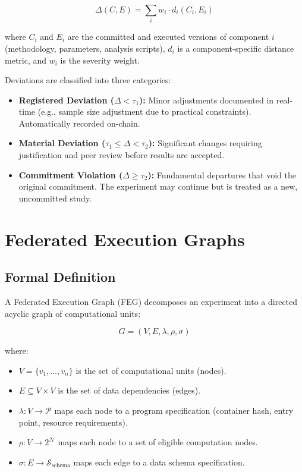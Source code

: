 \documentclass[11pt,a4paper]{article}
\begin{document}
\begin{equation}
    \Delta(C, E) = \sum_{i} w_i \cdot d_i(C_i, E_i)
\end{equation}

\noindent where $C_i$ and $E_i$ are the committed and executed versions of component $i$ (methodology, parameters, analysis scripts), $d_i$ is a component-specific distance metric, and $w_i$ is the severity weight.

Deviations are classified into three categories:
\begin{itemize}[leftmargin=*]
    \item \textbf{Registered Deviation ($\Delta < \tau_1$):} Minor adjustments documented in real-time (e.g., sample size adjustment due to practical constraints). Automatically recorded on-chain.
    \item \textbf{Material Deviation ($\tau_1 \leq \Delta < \tau_2$):} Significant changes requiring justification and peer review before results are accepted.
    \item \textbf{Commitment Violation ($\Delta \geq \tau_2$):} Fundamental departures that void the original commitment. The experiment may continue but is treated as a new, uncommitted study.
\end{itemize}

\section{Federated Execution Graphs}
\label{sec:execution}

\subsection{Formal Definition}

A Federated Execution Graph (FEG) decomposes an experiment into a directed acyclic graph of computational units:

\begin{equation}
    G = (V, E, \lambda, \rho, \sigma)
\end{equation}

\noindent where:
\begin{itemize}[leftmargin=*]
    \item $V = \{v_1, \ldots, v_n\}$ is the set of computational units (nodes).
    \item $E \subseteq V \times V$ is the set of data dependencies (edges).
    \item $\lambda: V \rightarrow \mathcal{P}$ maps each node to a program specification (container hash, entry point, resource requirements).
    \item $\rho: V \rightarrow 2^{\mathcal{N}}$ maps each node to a set of eligible computation nodes.
    \item $\sigma: E \rightarrow \mathcal{S}_{\text{schema}}$ maps each edge to a data schema specification.
\end{itemize}
\end{document}
